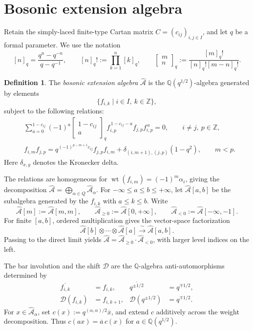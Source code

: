 \documentclass[12pt, reqno]{amsart}
\theoremstyle{plain}
\theoremstyle{definition}
\newtheorem{definition}[theorem]{Definition}
\numberwithin{equation}{section}
\newcommand{\qbinom}[2]{\left[\begin{array}{c} #1 \\ #2 \end{array}\right]_q}
\begin{document}
\section{Bosonic extension algebra}\label{sec:bosonic}

Retain the simply-laced finite-type Cartan matrix $C=(c_{ij})_{i,j\in I}$,
and let $q$ be a formal parameter. We use the notation
\[
[n]_q=\frac{q^{n}-q^{-n}}{q-q^{-1}},
\qquad
[n]_q!:=\prod_{k=1}^{n}[k]_q,
\qquad
\qbinom{m}{n}
:=
\frac{[m]_q!}{[n]_q![m-n]_q!}.
\]

\begin{definition}
The \emph{bosonic extension algebra} \(\widehat{\mathcal A}\) is the
\(\mathbb Q(q^{1/2})\)-algebra generated by elements
\[
\{f_{i,k}\mid i\in I,\ k\in\mathbb Z\},
\]
subject to the following relations:
\begin{align}
&\sum_{a=0}^{1-c_{ij}}(-1)^a
\qbinom{1-c_{ij}}{a}
f_{i,p}^{\,1-c_{ij}-a} f_{j,p} f_{i,p}^{\,a}
=0,
\qquad i\neq j,\ p\in\mathbb Z,
\label{eq:Serre}
\\[0.3em]
&f_{i,m}f_{j,p}
=
q^{(-1)^{p-m+1}c_{ij}} f_{j,p}f_{i,m}
+
\delta_{(i,m+1),(j,p)}(1-q^{2}),
\qquad m<p.
\label{eq:bosonic}
\end{align}
Here \(\delta_{x,y}\) denotes the Kronecker delta.
\end{definition}

The relations are homogeneous for
$\operatorname{wt}(f_{i,m})=(-1)^m\alpha_i$, giving the decomposition
$\widehat{\mathcal A}=\bigoplus_{\alpha\in Q}\widehat{\mathcal A}_\alpha$.
For $-\infty\leq a\leq b\leq+\infty$, let
$\widehat{\mathcal A}[a,b]$ be the subalgebra generated by the
$f_{i,k}$ with $a\leq k\leq b$. Write
\[
    \widehat{\mathcal A}[m]:=\widehat{\mathcal A}[m,m],\qquad
    \widehat{\mathcal A}_{\geq0}:=\widehat{\mathcal A}[0,+\infty],\qquad
    \widehat{\mathcal A}_{<0}:=\widehat{\mathcal A}[-\infty,-1].
\]
For finite $[a,b]$, ordered multiplication gives the vector-space
factorization
\[
    \widehat{\mathcal A}[b]\otimes\cdots\otimes\widehat{\mathcal A}[a]
    \xrightarrow{\ \sim\ }\widehat{\mathcal A}[a,b].
\]
Passing to the direct limit yields
$\widehat{\mathcal A}=\widehat{\mathcal A}_{\geq0}\cdot
\widehat{\mathcal A}_{<0}$, with larger level indices on the left.

The bar involution and the shift $\mathcal D$ are the
$\mathbb Q$-algebra anti-automorphisms determined by
\[
\begin{aligned}
    \overline{f_{i,k}}&=f_{i,k},&
    \overline{q^{\pm1/2}}&=q^{\mp1/2},\\
    \mathcal D(f_{i,k})&=f_{i,k+1},&
    \mathcal D(q^{\pm1/2})&=q^{\mp1/2}.
\end{aligned}
\]
For $x\in\widehat{\mathcal A}_\alpha$, set
$c(x):=q^{(\alpha,\alpha)/2}\overline{x}$, and extend $c$ additively
across the weight decomposition. Thus
$c(ax)=\overline a\,c(x)$ for $a\in\mathbb Q(q^{1/2})$.
\end{document}
